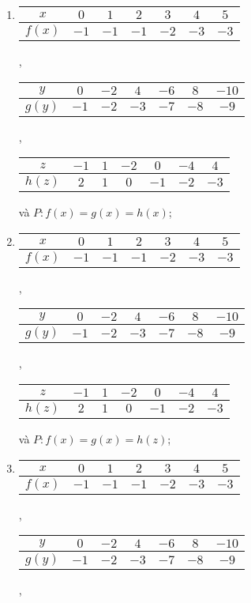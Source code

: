 \exercise[ex:hpt1]
\begin{enumerate}
   \item 
   \begin{tabular}{|c|c|c|c|c|c|c|}
      \hline
      $x$ & $0$ & $1$ & $2$ & $3$ & $4$ & $5$ \\
      \hline
      $f(x)$ & $-1$ & $-1$ & $-1$ & $-2$ & $-3$ & $-3$\\
      \hline
   \end{tabular},
   \begin{tabular}{|c|c|c|c|c|c|c|}
      \hline
      $y$ & $0$ & $-2$ & $4$ & $-6$ & $8$ & $-10$\\
      \hline
      $g(y)$ & $-1$ & $-2$ & $-3$ & $-7$ & $-8$ & $-9$\\
      \hline
   \end{tabular},

   \noindent\begin{tabular}{|c|c|c|c|c|c|c|}
      \hline
      $z$ & $-1$ & $1$ & $-2$ & $0$ & $-4$ & $4$\\
      \hline
      $h(z)$ & $2$ & $1$ & $0$ & $-1$ & $-2$ & $-3$\\
      \hline
   \end{tabular} và $P:f(x) = g(x) = h(x)$;

   \item
   \begin{tabular}{|c|c|c|c|c|c|c|}
      \hline
      $x$ & $0$ & $1$ & $2$ & $3$ & $4$ & $5$ \\
      \hline
      $f(x)$ & $-1$ & $-1$ & $-1$ & $-2$ & $-3$ & $-3$\\
      \hline
   \end{tabular},
   \begin{tabular}{|c|c|c|c|c|c|c|}
      \hline
      $y$ & $0$ & $-2$ & $4$ & $-6$ & $8$ & $-10$\\
      \hline
      $g(y)$ & $-1$ & $-2$ & $-3$ & $-7$ & $-8$ & $-9$\\
      \hline
   \end{tabular},

   \noindent\begin{tabular}{|c|c|c|c|c|c|c|}
      \hline
      $z$ & $-1$ & $1$ & $-2$ & $0$ & $-4$ & $4$\\
      \hline
      $h(z)$ & $2$ & $1$ & $0$ & $-1$ & $-2$ & $-3$\\
      \hline
   \end{tabular} và $P:f(x) = g(x) = h(z)$;

   \item
   \begin{tabular}{|c|c|c|c|c|c|c|}
      \hline
      $x$ & $0$ & $1$ & $2$ & $3$ & $4$ & $5$ \\
      \hline
      $f(x)$ & $-1$ & $-1$ & $-1$ & $-2$ & $-3$ & $-3$\\
      \hline
   \end{tabular},
   \begin{tabular}{|c|c|c|c|c|c|c|}
      \hline
      $y$ & $0$ & $-2$ & $4$ & $-6$ & $8$ & $-10$\\
      \hline
      $g(y)$ & $-1$ & $-2$ & $-3$ & $-7$ & $-8$ & $-9$\\
      \hline
   \end{tabular},


\end{enumerate}

